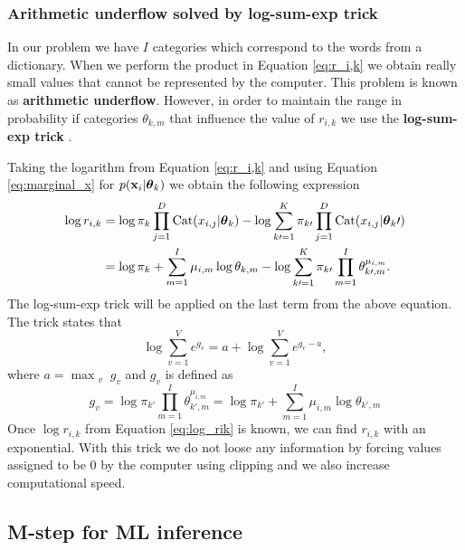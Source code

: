 \documentclass[12pt]{article}
\begin{document}
\subsubsection{Arithmetic underflow solved by log-sum-exp trick}

In our problem we have $I$ categories which correspond to the words from a dictionary. When we perform the product in Equation \ref{eq:r_i,k} we obtain really small values that cannot be represented by the computer. This problem is known as \textbf{arithmetic underflow}. However, in order to maintain the range in probability if categories $\theta_{k,m}$ that influence the value of $r_{i,k}$ we use the \textbf{log-sum-exp trick} \cite{logsumexp}.

\noindent Taking the logarithm from Equation \ref{eq:r_i,k} and using Equation \ref{eq:marginal_x} for $p(\mathbf{x}_i|\boldsymbol\theta_k)$ we obtain the following expression
\begin{align}\label{eq:log_rik}
\log r_{i,k} & = \log \pi_k\prod_{j=1}^{D}\operatorname{\mathrm{Cat}}(x_{i,j}|\boldsymbol\theta_k) - \log \sum \limits_{k\prime=1}^{K} \pi_{k\prime} \prod \limits_{j=1}^{D}\operatorname{\mathrm{Cat}}(x_{i,j}|\boldsymbol\theta_k\prime)\\
& = \log \pi_k + \sum\limits_{m=1}^{I}\mu_{i,m}\log\theta_{k,m} - \log \sum \limits_{k\prime=1}^{K} \pi_{k\prime} \prod \limits_{m=1}^{I} \theta_{k\prime,m}^{\mu_{i,m}}.
\end{align}
The log-sum-exp trick will be applied on the last term from the above equation. The trick states that
\begin{equation}
\log \sum _ { v = 1 } ^ { V } e ^ { g _ { v } } = a + \log \sum _ { v = 1 } ^ { V } e ^ { g _ { v } - a },
\end{equation}
where $a = \max_{\substack{v}} g_v$ and $g_v$ is defined as 
\begin{equation}
g_v = \log \pi_{k\prime} \prod \limits_{m=1}^{I} \theta_{k\prime,m}^{\mu_{i,m}} = \log \pi_{k\prime} + \sum\limits_{m=1}^{I}\mu_{i,m} \log \theta_{k\prime,m}
\end{equation}
Once $\log r_{i,k}$ from Equation \ref{eq:log_rik} is known, we can find $r_{i,k}$ with an exponential. With this trick we do not loose any information by forcing values assigned to be 0 by the computer using clipping and we also increase computational speed. 

\subsection{M-step for ML inference}
\end{document}
